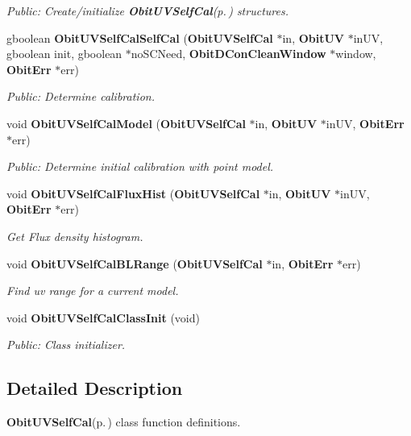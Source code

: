 \begin{CompactItemize}
\begin{CompactList}\small\item\em Public: Create/initialize {\bf Obit\-UVSelf\-Cal}{\rm (p.\,\pageref{structObitUVSelfCal})} structures. \item\end{CompactList}\item 
gboolean {\bf Obit\-UVSelf\-Cal\-Self\-Cal} ({\bf Obit\-UVSelf\-Cal} $\ast$in, {\bf Obit\-UV} $\ast$in\-UV, gboolean init, gboolean $\ast$no\-SCNeed, {\bf Obit\-DCon\-Clean\-Window} $\ast$window, {\bf Obit\-Err} $\ast$err)
\begin{CompactList}\small\item\em Public: Determine calibration. \item\end{CompactList}\item 
void {\bf Obit\-UVSelf\-Cal\-Model} ({\bf Obit\-UVSelf\-Cal} $\ast$in, {\bf Obit\-UV} $\ast$in\-UV, {\bf Obit\-Err} $\ast$err)
\begin{CompactList}\small\item\em Public: Determine initial calibration with point model. \item\end{CompactList}\item 
void {\bf Obit\-UVSelf\-Cal\-Flux\-Hist} ({\bf Obit\-UVSelf\-Cal} $\ast$in, {\bf Obit\-UV} $\ast$in\-UV, {\bf Obit\-Err} $\ast$err)
\begin{CompactList}\small\item\em Get Flux density histogram. \item\end{CompactList}\item 
void {\bf Obit\-UVSelf\-Cal\-BLRange} ({\bf Obit\-UVSelf\-Cal} $\ast$in, {\bf Obit\-Err} $\ast$err)
\begin{CompactList}\small\item\em Find uv range for a current model. \item\end{CompactList}\item 
void {\bf Obit\-UVSelf\-Cal\-Class\-Init} (void)
\begin{CompactList}\small\item\em Public: Class initializer. \item\end{CompactList}\end{CompactItemize}


\subsection{Detailed Description}
{\bf Obit\-UVSelf\-Cal}{\rm (p.\,\pageref{structObitUVSelfCal})} class function definitions. 

